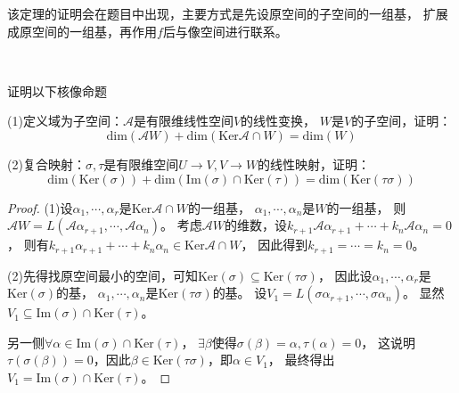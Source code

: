 \begin{note}
  该定理的证明会在题目中出现，主要方式是先设原空间的子空间的一组基，
  扩展成原空间的一组基，再作用$f$后与像空间进行联系。
\end{note}

~

\begin{exercise}[核像维数公式推广证明]
  证明以下核像命题
  
  (1)定义域为子空间：$\mathcal{A}$是有限维线性空间$V$的线性变换，
  $W$是$V$的子空间，证明：
  \begin{equation*}
    \mathrm{dim} (\mathcal{A} W) + \mathrm{dim}( \mathrm{Ker}\mathcal{A} \cap W) = \mathrm{dim}(W)
  \end{equation*}

  (2)复合映射：$\sigma, \tau$是有限维空间$U \rightarrow V, V \rightarrow W$的线性映射，证明：
  \begin{equation*}
    \mathrm{dim}( \mathrm{Ker} (\sigma)) + \mathrm{dim}( \mathrm{Im}(\sigma) \cap \mathrm{Ker} (\tau)) = \mathrm{dim} ( \mathrm{Ker}(\tau \sigma))
  \end{equation*}
\end{exercise}

\begin{proof}
  (1)设$\alpha_1,\cdots,\alpha_r$是$\mathrm{Ker}\mathcal{A} \cap W$的一组基，
  $\alpha_1,\cdots,\alpha_n$是$W$的一组基，
  则$\mathcal{A}W = L(\mathcal{A} \alpha_{r+1}, \cdots, \mathcal{A} \alpha_n)$。
  考虑$\mathcal{A} W$的维数，设$k_{r+1} \mathcal{A} \alpha_{r+1} + \cdots + k_n \mathcal{A} \alpha_n = 0$，
  则有$k_{r+1}\alpha_{r+1} + \cdots + k_n \alpha_n \in \mathrm{Ker}\mathcal{A} \cap W$，
  因此得到$k_{r+1} = \cdots = k_n = 0$。

  (2)先得找原空间最小的空间，可知$\mathrm{Ker}(\sigma) \subseteq \mathrm{Ker}(\tau \sigma)$，
  因此设$\alpha_1,\cdots,\alpha_r$是$\mathrm{Ker}(\sigma)$的基，
  $\alpha_1,\cdots, \alpha_n$是$\mathrm{Ker}(\tau \sigma)$的基。
  设$V_1  = L(\sigma \alpha_{r+1},\cdots,\sigma \alpha_n)$。
  显然$V_1 \subseteq \mathrm{Im}(\sigma) \cap \mathrm{Ker}(\tau)$。

  另一侧$\forall \alpha \in \mathrm{Im}(\sigma ) \cap \mathrm{Ker}(\tau)$，
  $\exists \beta$使得$\sigma (\beta) = \alpha, \tau (\alpha )= 0$，
  这说明$\tau(\sigma(\beta)) = 0$，因此$\beta \in \mathrm{Ker}(\tau \sigma)$，即$\alpha \in V_1$，
  最终得出$V_1 = \mathrm{Im}(\sigma) \cap \mathrm{Ker}(\tau)$。
\end{proof}

~

